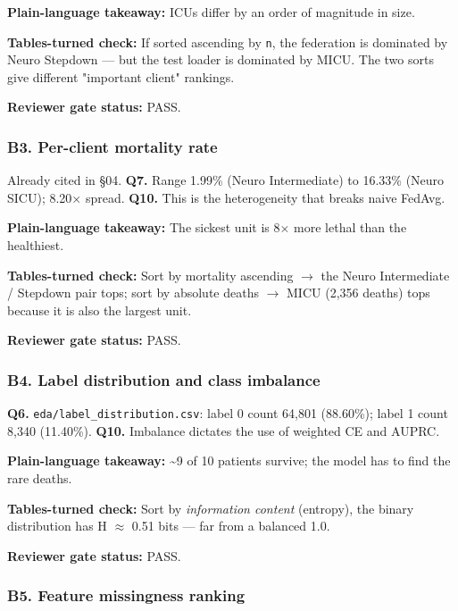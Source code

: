 \documentclass{article}
\begin{document}
\textbf{Plain-language takeaway:} ICUs differ by an order of magnitude in size.


\textbf{Tables-turned check:} If sorted ascending by \texttt{n}, the federation is dominated by Neuro Stepdown --- but the test loader is dominated by MICU. The two sorts give different "important client" rankings.


\textbf{Reviewer gate status:} PASS.


\subsubsection{B3. Per-client mortality rate}


Already cited in §04. \textbf{Q7.} Range 1.99\% (Neuro Intermediate) to 16.33\% (Neuro SICU); 8.20\ensuremath{\times} spread. \textbf{Q10.} This is the heterogeneity that breaks naive FedAvg.


\textbf{Plain-language takeaway:} The sickest unit is 8\ensuremath{\times} more lethal than the healthiest.


\textbf{Tables-turned check:} Sort by mortality ascending \ensuremath{\rightarrow} the Neuro Intermediate / Stepdown pair tops; sort by absolute deaths \ensuremath{\rightarrow} MICU (2,356 deaths) tops because it is also the largest unit.


\textbf{Reviewer gate status:} PASS.


\subsubsection{B4. Label distribution and class imbalance}


\textbf{Q6.} \texttt{eda/label\_distribution.csv}: label 0 count 64,801 (88.60\%); label 1 count 8,340 (11.40\%). \textbf{Q10.} Imbalance dictates the use of weighted CE and AUPRC.


\textbf{Plain-language takeaway:} \textasciitilde{}9 of 10 patients survive; the model has to find the rare deaths.


\textbf{Tables-turned check:} Sort by \emph{information content} (entropy), the binary distribution has H \ensuremath{\approx} 0.51 bits --- far from a balanced 1.0.


\textbf{Reviewer gate status:} PASS.


\subsubsection{B5. Feature missingness ranking}
\end{document}
